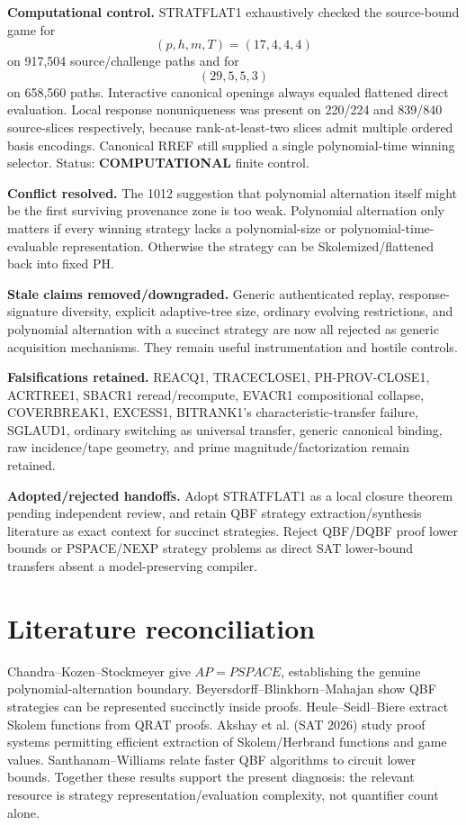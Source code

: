 \documentclass[11pt]{article}
\begin{document}
\textbf{Computational control.}
STRATFLAT1 exhaustively checked the source-bound game for
\[
(p,h,m,T)=(17,4,4,4)
\]
on 917,504 source/challenge paths and for
\[
(29,5,5,3)
\]
on 658,560 paths. Interactive canonical openings always equaled flattened direct evaluation.
Local response nonuniqueness was present on 220/224 and 839/840 source-slices respectively, because
rank-at-least-two slices admit multiple ordered basis encodings. Canonical RREF still supplied a
single polynomial-time winning selector. Status: \textbf{COMPUTATIONAL} finite control.

\textbf{Conflict resolved.}
The 1012 suggestion that polynomial alternation itself might be the first surviving provenance zone
is too weak. Polynomial alternation only matters if every winning strategy lacks a polynomial-size
or polynomial-time-evaluable representation. Otherwise the strategy can be Skolemized/flattened
back into fixed PH.

\textbf{Stale claims removed/downgraded.}
Generic authenticated replay, response-signature diversity, explicit adaptive-tree size, ordinary
evolving restrictions, and polynomial alternation with a succinct strategy are now all rejected as
generic acquisition mechanisms. They remain useful instrumentation and hostile controls.

\textbf{Falsifications retained.}
REACQ1, TRACECLOSE1, PH-PROV-CLOSE1, ACRTREE1, SBACR1 reread/recompute, EVACR1 compositional
collapse, COVERBREAK1, EXCESS1, BITRANK1's characteristic-transfer failure, SGLAUD1, ordinary
switching as universal transfer, generic canonical binding, raw incidence/tape geometry, and prime
magnitude/factorization remain retained.

\textbf{Adopted/rejected handoffs.}
Adopt STRATFLAT1 as a local closure theorem pending independent review, and retain QBF strategy
extraction/synthesis literature as exact context for succinct strategies. Reject QBF/DQBF proof
lower bounds or PSPACE/NEXP strategy problems as direct SAT lower-bound transfers absent a
model-preserving compiler.

\section*{Literature reconciliation}
Chandra--Kozen--Stockmeyer give \(AP=PSPACE\), establishing the genuine polynomial-alternation
boundary. Beyersdorff--Blinkhorn--Mahajan show QBF strategies can be represented succinctly inside
proofs. Heule--Seidl--Biere extract Skolem functions from QRAT proofs. Akshay et al. (SAT 2026)
study proof systems permitting efficient extraction of Skolem/Herbrand functions and game values.
Santhanam--Williams relate faster QBF algorithms to circuit lower bounds. Together these results
support the present diagnosis: the relevant resource is strategy representation/evaluation
complexity, not quantifier count alone.
\end{document}
